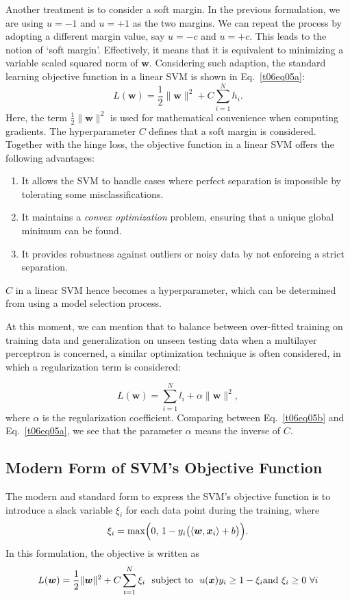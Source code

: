 \documentclass[12pt]{article}
\begin{document}
Another treatment is to consider a soft margin. In the previous formulation, we are using $u = -1$ and $u = +1$ as the two margins. We can repeat the process by adopting a different margin value, say $u = -c$ and $u = +c$. This leads to the notion of `soft margin'. Effectively, it means that it is equivalent to minimizing a variable scaled squared norm of $\bm{w}$. Considering such adaption, the standard learning objective function in a linear SVM is shown in Eq.~\ref{t06eq05a}:
\begin{equation}
L(\bm{w}) = \frac{1}{2}\|\bm{w}\|^2 + C \sum_{i=1}^N h_i.
\label{t06eq05a}
\end{equation}
Here, the term $\frac{1}{2}\|\bm{w}\|^2$ is used for mathematical convenience when computing gradients. The hyperparameter $C$ defines that a soft margin is considered. Together with the hinge loss, the objective function in a linear SVM offers the following advantages:
\begin{enumerate}
    \item It allows the SVM to handle cases where perfect separation is impossible by tolerating some misclassifications.
    \item It maintains a \textit{convex optimization} problem, ensuring that a unique global minimum can be found.
    \item It provides robustness against outliers or noisy data by not enforcing a strict separation.
\end{enumerate}
$C$ in a linear SVM hence becomes a hyperparameter, which can be determined from using a model selection process. 

At this moment, we can mention that to balance between over-fitted training on training data and  generalization on unseen testing data when a multilayer perceptron is concerned, a similar optimization technique is often considered, in which a regularization term is considered: 

\begin{equation}
L(\bm{w}) = \sum_{i=1}^N l_i + \alpha \|\bm{w}\|^2,
\label{t06eq05b}
\end{equation}
where $\alpha$ is the regularization coefficient. Comparing between Eq.~\ref{t06eq05b} and Eq.~\ref{t06eq05a}, we see that the parameter $\alpha$ means the inverse of $C$. 

\subsection{Modern Form of SVM’s Objective Function}
 The modern and standard form to express the SVM's objective function is to introduce a slack variable \(\xi_i\) for each data point during the training, where 
\[
\xi_i = \max\Bigl(0,\, 1 - y_i\bigl(\langle \bm{w}, \bm{x}_i \rangle + b\bigr)\Bigr).
\]
In this formulation, the objective is written as 
\[
L(\bm{w}) = \frac{1}{2}\|\bm{w}\|^2 + C \sum_{i=1}^{N} \xi_i \\
\mathrm{\ \ subject\ to\ \ } u(\bm{x}) y_i \ge 1 - \xi_i \mathrm{and\ } \xi_i \ge 0\ \forall i
\]
\end{document}
